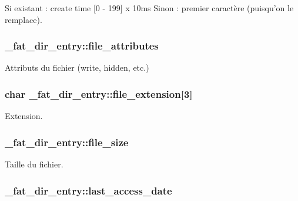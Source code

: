 Si existant \-: create time \mbox{[}0 -\/ 199\mbox{]} x 10ms Sinon \-: premier caractère (puisqu'on le remplace). \hypertarget{struct__fat__dir__entry_a4672718a4c89a279dd1c2b083ea73789}{
\subsubsection[{file\-\_\-attributes}]{ \-\_\-fat\-\_\-dir\-\_\-entry\-::file\-\_\-attributes}}\label{struct__fat__dir__entry_a4672718a4c89a279dd1c2b083ea73789}
Attributs du fichier (write, hidden, etc.) \hypertarget{struct__fat__dir__entry_addf0d1b2feefb5d50d90ea66b06703b9}{
\subsubsection[{file\-\_\-extension}]{\setlength{\rightskip}{0pt plus 5cm}char \-\_\-fat\-\_\-dir\-\_\-entry\-::file\-\_\-extension\mbox{[}3\mbox{]}}}\label{struct__fat__dir__entry_addf0d1b2feefb5d50d90ea66b06703b9}
Extension. \hypertarget{struct__fat__dir__entry_a557cd14b001d64851ad5e7cadb742411}{
\subsubsection[{file\-\_\-size}]{ \-\_\-fat\-\_\-dir\-\_\-entry\-::file\-\_\-size}}\label{struct__fat__dir__entry_a557cd14b001d64851ad5e7cadb742411}
Taille du fichier. \hypertarget{struct__fat__dir__entry_aa53da680ae2a6594c0f956c80a1b8ca4}{
\subsubsection[{last\-\_\-access\-\_\-date}]{ \-\_\-fat\-\_\-dir\-\_\-entry\-::last\-\_\-access\-\_\-date}}\label{struct__fat__dir__entry_aa53da680ae2a6594c0f956c80a1b8ca4}
